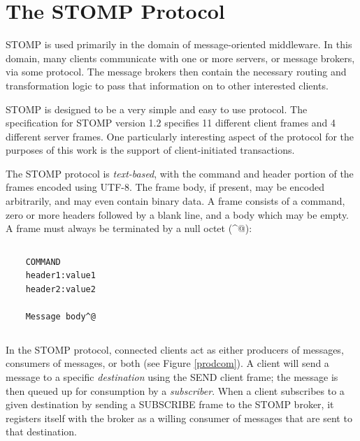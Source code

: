 \documentclass[conference, letterpaper]{IEEEtran}
\begin{document}
\section{The STOMP Protocol}

STOMP is used primarily in the domain of message-oriented middleware. In this domain, many clients
communicate with one or more servers, or message brokers, via some protocol. The message brokers then contain the necessary routing and transformation logic to pass that information on to other interested clients.

STOMP is designed to be a very simple and easy to use protocol. The specification for STOMP version 1.2 specifies 11 different client frames and 4 different server frames. One particularly interesting aspect of the protocol for the purposes of this work is the support of client-initiated transactions.

The STOMP protocol is \textit{text-based}, with the command and header portion of the frames encoded using UTF-8. The frame body, if present, may be encoded arbitrarily, and may even contain binary data. A frame consists of a command, zero or more headers followed by a blank line, and a body which may be empty. A frame must always be terminated by a null octet (\^{}@):

\begin{verbatim}
\end{verbatim}
\begin{verbatim}
    COMMAND
    header1:value1
    header2:value2

    Message body^@
\end{verbatim}
\begin{verbatim}
\end{verbatim}

In the STOMP protocol, connected clients act as either producers of messages, consumers of messages, or both (see Figure \ref{prodcom}). A client will send a message to a specific \textit{destination} using the SEND client frame; the message is then queued up for consumption by a \textit{subscriber}. When a client subscribes to a given destination by sending a SUBSCRIBE frame to the STOMP broker, it registers itself with the broker as a willing consumer of messages that are sent to that destination.
\end{document}
